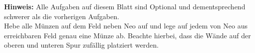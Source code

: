 
\textbf{Hinweis:} Alle Aufgaben auf diesem Blatt sind Optional und dementsprechend schwerer als die vorherigen Aufgaben.\\
Hebe alle Münzen auf dem Feld neben Neo auf und lege auf jedem von Neo aus erreichbaren Feld genau eine Münze ab. 
Beachte hierbei, dass die Wände auf der oberen und unteren Spur zufällig platziert werden.


		

	